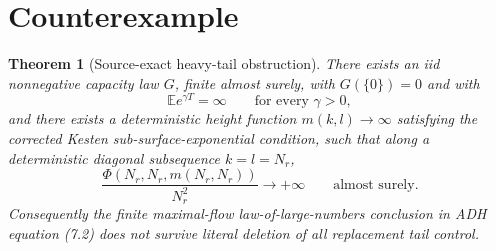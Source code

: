 \documentclass[11pt]{article}
\newtheorem{theorem}{Theorem}
\newcommand{\Ee}{\mathbb E}
\begin{document}
\section{Counterexample}

\begin{theorem}[Source-exact heavy-tail obstruction]
\label{thm:counterexample}
There exists an iid nonnegative capacity law \(G\), finite almost surely, with \(G(\{0\})=0\) and with
\[
  \Ee e^{\gamma T}=\infty\qquad\text{for every }\gamma>0,
\]
and there exists a deterministic height function \(m(k,l)\to\infty\) satisfying the corrected Kesten sub-surface-exponential condition, such that along a deterministic diagonal subsequence \(k=l=N_r\),
\[
  \frac{\Phi(N_r,N_r,m(N_r,N_r))}{N_r^2}\longrightarrow+\infty
  \qquad\text{almost surely}.
\]
Consequently the finite maximal-flow law-of-large-numbers conclusion in ADH equation (7.2) does not survive literal deletion of all replacement tail control.
\end{theorem}
\end{document}
